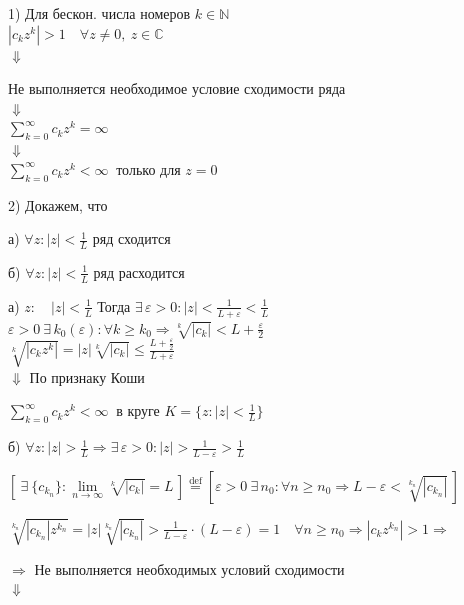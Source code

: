 \documentclass[a4paper,12pt]{article} %
\begin{document}
1) Для бескон. числа номеров $k \in \mathbb{N}$ \\
\indent$|c_k z^k| > 1 \quad \forall z \neq 0, \  z \in \mathbb{C}$ \\
\hspace*{3 cm} $\Downarrow$

Не выполняется необходимое условие сходимости ряда \\
\hspace*{3 cm} $\Downarrow$\\
\hspace*{2 cm} $\sum\limits_{k = 0}^\infty c_k z^k = \infty $\\
\hspace*{3 cm} $\Downarrow$\\
\hspace*{1.9 cm} $\sum\limits_{k = 0}^\infty c_k z^k < \infty \ $ только для $z = 0$

2) Докажем, что

а) $\forall z: |z| < \frac{1}{L}$ ряд сходится

б) $\forall z: |z| < \frac{1}{L}$ ряд расходится

а) $z: \quad |z| < \frac{1}{L}$
Тогда $\exists \, \varepsilon > 0: |z| < \frac{1}{L + \varepsilon} < \frac{1}{L} $\\

$\varepsilon > 0 \  \exists \, k_0(\varepsilon): \forall k \geqslant k_0 \Rightarrow \sqrt[k]{|c_k|} < L + \frac{\varepsilon}{2}
$ \\
$ \sqrt[k]{|c_k z^k|} = |z| \sqrt[k]{|c_k|} \leqslant \frac{L + \frac{\varepsilon}{2}}{L + \varepsilon}
$\\

$\Downarrow$ По признаку Коши

$\sum\limits_{k = 0}^\infty c_k z^k < \infty \ $ в круге $K = \{z: |z| < \frac{1}{L}\}$

б) $\forall z: |z| > \frac{1}{L} \Rightarrow \exists \, \varepsilon > 0: |z| > \frac{1}{L - \varepsilon} > \frac{1}{L} $

$[\   \exists \  \{c_{k_n}\} : \lim\limits_{n \to \infty} \sqrt[k]{|c_k|} = L \,] \stackrel{\text{def}}{=} [\varepsilon > 0 \  \exists \, n_0 : \forall n \geqslant n_0 \Rightarrow L - \varepsilon < \sqrt[k_n]{|c_{k_n}|} \,]$ 

$\sqrt[k_n]{|c_{k_n}| z^{k_n}} = |z| \sqrt[k_n]{|c_{k_n}|} > \frac{1}{L - \varepsilon} \cdot (L - \varepsilon) = 1 \quad \forall n \geqslant n_0  \Rightarrow |c_k z^{k_n}| > 1 \Rightarrow$

$\Rightarrow$ Не выполняется необходимых условий сходимости \\
\hspace*{3 cm} $\Downarrow$
\end{document}
